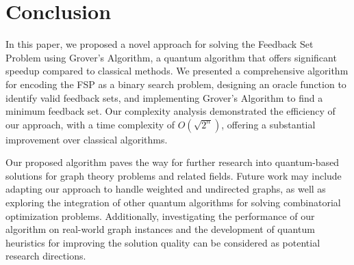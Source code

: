 \section{Conclusion}
\label{sec:conclusion}

In this paper, we proposed a novel approach for solving the Feedback Set Problem using Grover's Algorithm, a quantum algorithm that offers significant speedup compared to classical methods. We presented a comprehensive algorithm for encoding the FSP as a binary search problem, designing an oracle function to identify valid feedback sets, and implementing Grover's Algorithm to find a minimum feedback set. Our complexity analysis demonstrated the efficiency of our approach, with a time complexity of $O(\sqrt{2^n})$, offering a substantial improvement over classical algorithms.

Our proposed algorithm paves the way for further research into quantum-based solutions for graph theory problems and related fields. Future work may include adapting our approach to handle weighted and undirected graphs, as well as exploring the integration of other quantum algorithms for solving combinatorial optimization problems. Additionally, investigating the performance of our algorithm on real-world graph instances and the development of quantum heuristics for improving the solution quality can be considered as potential research directions.

